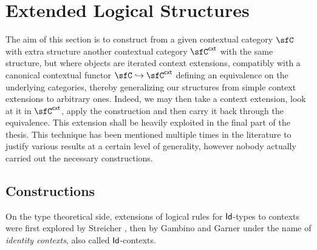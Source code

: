 \chapter{Extended Logical Structures}\label{second}

The aim of this section is to construct from a given contextual category $\sfC$
with extra structure another contextual category $\sfC^{\cxt}$ with the same
structure, but where objects are iterated context extensions, compatibly with a
canonical contextual functor $\sfC\hookrightarrow\sfC^{\cxt}$ defining an
equivalence on the underlying categories, thereby
generalizing our structures from simple context extensions to arbitrary ones.
Indeed, we may then take a context extension, look at it in $\sfC^{\cxt}$, apply
the construction and then carry it back through the equivalence. This extension
shall be heavily exploited in the final part of the thesis. This technique has
been mentioned multiple times in the literature to justify various results at a
certain level of generality, however nobody actually carried out the necessary
constructions.

\section{Constructions}

On the type theoretical side, extensions of logical rules for $\operatorname{\mathsf{Id}}$-types to
contexts were first explored by Streicher \cite{Str93}, then by Gambino and
Garner \cite{GG08,Gar09b} under the name of \emph{identity contexts}, also
called $\operatorname{\mathsf{Id}}$-contexts.

